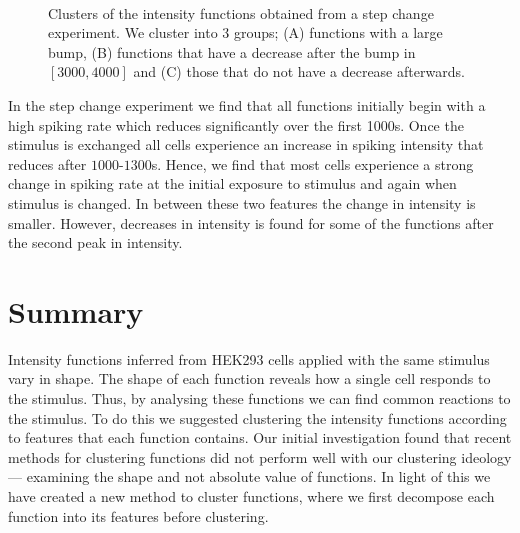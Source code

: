 \documentclass[12pt]{book} %
\begin{document}
\begin{figure}[t!]
   \hrulefill
   \begin{center} 
     \quad
      \\ 
      
    \end{center}     
    \caption{Clusters of the intensity functions obtained from a step change experiment. We cluster into 3 groups; (A) functions with a large bump, (B) functions that have a decrease after the bump in $[3000,4000]$ and (C) those that do not have a decrease afterwards.}
    \label{fig:Martin4_Clus}
    \hrulefill
    \end{figure}
    
     
In the step change experiment we find that all functions initially begin with a high spiking rate which reduces significantly over the first 1000s. Once the stimulus is exchanged all cells experience an increase in spiking intensity that reduces after $1000$-$1300$s.  Hence, we find that most cells experience a strong change in spiking rate at the initial exposure to stimulus and again when stimulus is changed. In between these two features the change in intensity is smaller. However, decreases in intensity is found for some of the functions after the second peak in intensity.


\section{Summary}

Intensity functions inferred from HEK293 cells applied with the same stimulus vary in shape. The shape of each function reveals how a single cell responds to the stimulus. Thus, by analysing these functions we can find common reactions to the stimulus. To do this we suggested clustering the intensity functions according to features that each function contains. Our initial investigation found that recent methods for clustering functions did not perform well with our clustering ideology --- examining the shape and not absolute value of functions. In light of this we have created a new method to cluster functions, where we first decompose each function into its features before clustering. 
\end{document}
